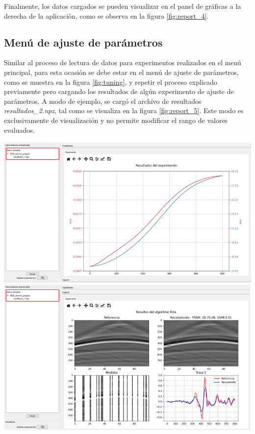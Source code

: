 \documentclass[12pt,twoside,letter]{ol-softwaremanual}
\newenvironment{Figure}
  {\par\medskip\noindent\minipage{\linewidth}}
  {\endminipage\par\medskip}
\begin{document}
Finalmente, los datos cargados se pueden visualizar en el panel de gráficas a la derecha de la aplicación, como se observa en la figura \ref{fig:report_4}.

\subsection{Menú de ajuste de parámetros}

Similar al proceso de lectura de datos para experimentos realizados en el menú principal, para esta ocasión se debe estar en el menú de ajuste de parámetros, como se muestra en la figura \ref{fig:tuning}, y repetir el proceso explicado previamente pero cargando los resultados de algún experimento de ajuste de parámetros. A modo de ejemplo, se cargó el archivo de resultados \emph{resultados\_2.npz}, tal como se visualiza en la figura \ref{fig:report_5}. Este modo es exclusivamente de visualización y no permite modificar el rango de valores evaluados.

\begin{Figure}
    \centering
    \includegraphics[width=1\linewidth]{report-4.png}
    \label{fig:report_4}
\end{Figure}
\end{document}

